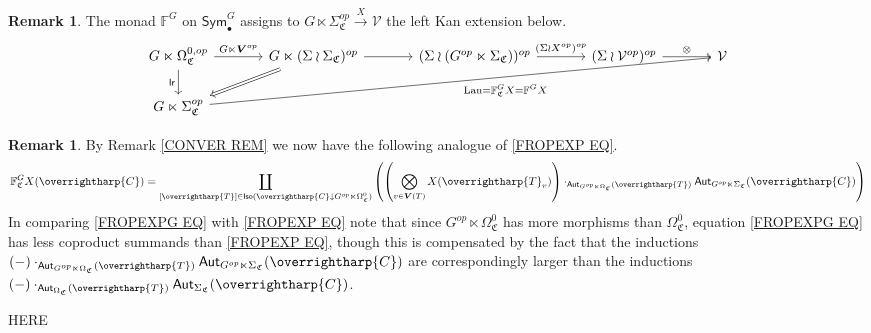 \documentclass[a4paper,10pt
,draft
]{article}%
\numberwithin{equation}{section}
\numberwithin{figure}{section}
\theoremstyle{definition} %
\newtheorem{remark}[equation]{Remark}%
\newcommand{\vect}[1]{\text{\overrightharp{\ensuremath{#1}}}}
\DeclareMathOperator{\Lan}{Lan}%
\newcommand{\V}{\ensuremath{\mathcal V}}
\newcommand{\1}{\ensuremath{\mathbbm 1}}%
\begin{document}
\begin{remark}\label{FGC REM}
The monad $\mathbb{F}^G$ on $\mathsf{Sym}^G_{\bullet}$
assigns to 
$G \ltimes \Sigma^{op}_{\mathfrak{C}} \xrightarrow{X} \V$
the left Kan extension below.
\begin{equation}\label{FGC_EQ}
	\begin{tikzcd}[column sep = 35pt]
		G \ltimes \Omega^{0,op}_{\mathfrak{C}}
		\arrow[d, "\mathsf{lr}"']
		\arrow[r, "G \ltimes \boldsymbol{V}^{op}"]
	&
		G \ltimes (\Sigma \wr \Sigma_{\mathfrak{C}})^{op} \arrow{r}
		\arrow[dl, Rightarrow]
	&
		(\Sigma \wr (G^{op} \ltimes \Sigma_{\mathfrak{C}}))^{op} \arrow[r, "(\Sigma \wr X^{op})^{op}"]
	&
		(\Sigma \wr \V^{op})^{op} \arrow[r, "\otimes"]
	&
		\V
\\
	G\ltimes\Sigma^{op}_{\mathfrak{C}}
	\arrow[urrrr, "\Lan = \mathbb F_{\mathfrak{C}}^G X = \mathbb F^G X"']
	\end{tikzcd}
\end{equation}
\end{remark}







\begin{remark}
By Remark \ref{CONVER REM} we now have the following analogue of
\eqref{FROPEXP EQ}.
\begin{equation}\label{FROPEXPG EQ}
\mathbb{F}^G_{\mathfrak{C}} X (\vect{C})
=
\coprod_{[\vect{T}] \in 
\mathsf{Iso}(\vect{C} \downarrow G^{op} \ltimes \Omega^0_{\mathfrak{C}})}
\left(
\left(
\bigotimes_{v \in \boldsymbol{V}(T)} X(\vect{T}_v)
\right)
\cdot_{\mathsf{Aut}_{G^{op} \ltimes \Omega_{\mathfrak{C}}}(\vect{T})}
\mathsf{Aut}_{G^{op} \ltimes \Sigma_{\mathfrak{C}}}(\vect{C})
\right)
\end{equation}
In comparing \eqref{FROPEXPG EQ} with \eqref{FROPEXP EQ} note that since 
$G^{op} \ltimes \Omega^0_{\mathfrak{C}}$
has more morphisms than
$\Omega^0_{\mathfrak{C}}$,
equation \eqref{FROPEXPG EQ} has less coproduct summands than \eqref{FROPEXP EQ},
though this is compensated by the fact that the inductions
$(-)\cdot_{\mathsf{Aut}_{G^{op} \ltimes \Omega_{\mathfrak{C}}}(\vect{T})}
\mathsf{Aut}_{G^{op} \ltimes \Sigma_{\mathfrak{C}}}(\vect{C})$
are correspondingly larger than the inductions
$(-)\cdot_{\mathsf{Aut}_{\Omega_{\mathfrak{C}}}(\vect{T})}
\mathsf{Aut}_{\Sigma_{\mathfrak{C}}}(\vect{C})$.
\end{remark}




{\color{red} HERE}
\end{document}
